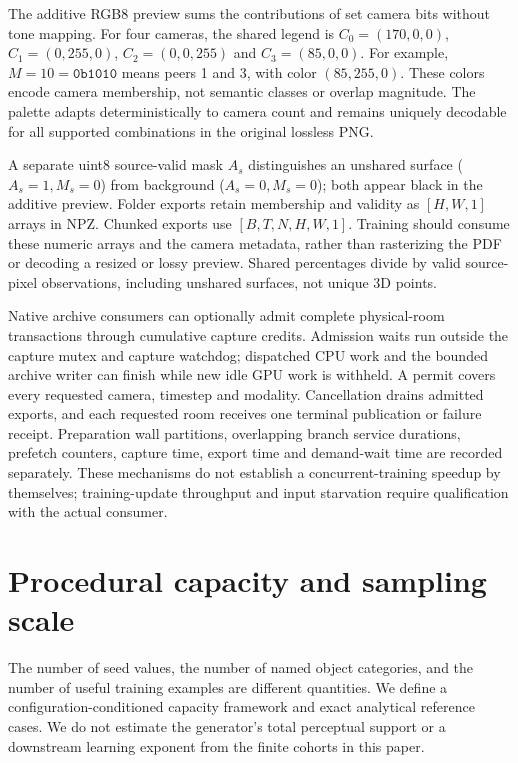 \documentclass{article}
\begin{document}
The additive RGB8 preview sums the contributions of set camera bits without tone mapping. For four cameras, the shared legend is $C_0=(170,0,0)$, $C_1=(0,255,0)$, $C_2=(0,0,255)$ and $C_3=(85,0,0)$. For example, $M=10=\texttt{0b1010}$ means peers 1 and 3, with color $(85,255,0)$. These colors encode camera membership, not semantic classes or overlap magnitude. The palette adapts deterministically to camera count and remains uniquely decodable for all supported combinations in the original lossless PNG.

A separate uint8 source-valid mask $A_s$ distinguishes an unshared surface ($A_s=1,M_s=0$) from background ($A_s=0,M_s=0$); both appear black in the additive preview. Folder exports retain membership and validity as $[H,W,1]$ arrays in NPZ. Chunked exports use $[B,T,N,H,W,1]$. Training should consume these numeric arrays and the camera metadata, rather than rasterizing the PDF or decoding a resized or lossy preview. Shared percentages divide by valid source-pixel observations, including unshared surfaces, not unique 3D points.




Native archive consumers can optionally admit complete physical-room transactions through cumulative capture credits. Admission waits run outside the capture mutex and capture watchdog; dispatched CPU work and the bounded archive writer can finish while new idle GPU work is withheld. A permit covers every requested camera, timestep and modality. Cancellation drains admitted exports, and each requested room receives one terminal publication or failure receipt. Preparation wall partitions, overlapping branch service durations, prefetch counters, capture time, export time and demand-wait time are recorded separately. These mechanisms do not establish a concurrent-training speedup by themselves; training-update throughput and input starvation require qualification with the actual consumer.







\section{Procedural capacity and sampling scale}
\label{sec:capacity}
The number of seed values, the number of named object categories, and the number
of useful training examples are different quantities. We define a
configuration-conditioned capacity framework and exact analytical reference
cases. We do not estimate the generator's total perceptual support or a
downstream learning exponent from the finite cohorts in this paper.
\end{document}
